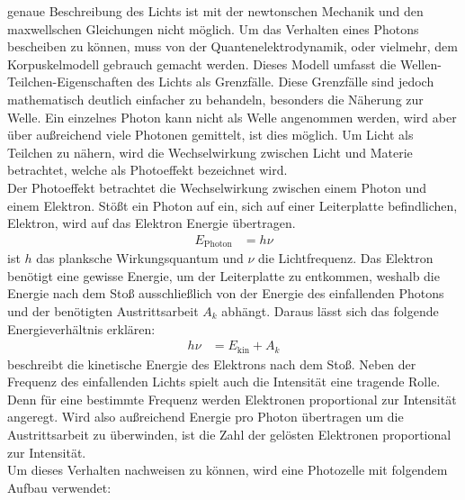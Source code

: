     \justifying genaue Beschreibung des Lichts ist mit der newtonschen Mechanik und den maxwellschen Gleichungen nicht möglich. Um das Verhalten eines Photons
    bescheiben zu können, muss von der Quantenelektrodynamik, oder vielmehr, dem Korpuskelmodell gebrauch gemacht werden. Dieses Modell umfasst die Wellen-Teilchen-Eigenschaften
    des Lichts als Grenzfälle. Diese Grenzfälle sind jedoch mathematisch deutlich einfacher zu behandeln, besonders die Näherung zur Welle. Ein einzelnes Photon kann nicht als
    Welle angenommen werden, wird aber über außreichend viele Photonen gemittelt, ist dies möglich. Um Licht als Teilchen zu nähern, wird die Wechselwirkung zwischen Licht und 
    Materie betrachtet, welche als Photoeffekt bezeichnet wird.\\
    Der Photoeffekt betrachtet die Wechselwirkung zwischen einem Photon und einem Elektron. Stößt ein Photon auf ein, sich auf einer Leiterplatte befindlichen, Elektron, wird
    auf das Elektron Energie übertragen. \cite{V500}
    \begin{align}
        E_{\text{Photon}} &= h\nu \label{eq:1}
    \end{align} 
    \justifying ist $h$ das planksche Wirkungsquantum und $\nu$ die Lichtfrequenz. Das Elektron benötigt eine gewisse Energie, um der Leiterplatte zu entkommen, weshalb die Energie
    nach dem Stoß ausschließlich von der Energie des einfallenden Photons und der benötigten Austrittsarbeit $A_k$ abhängt. Daraus lässt sich das folgende Energieverhältnis
    erklären: \cite{V500}
    \begin{align}
        h\nu &= E_{\text{kin}} + A_k \label{eq:2}
    \end{align}
    \justifying beschreibt die kinetische Energie des Elektrons nach dem Stoß. Neben der Frequenz des einfallenden Lichts spielt auch die Intensität eine tragende Rolle. 
    Denn für eine bestimmte Frequenz werden Elektronen proportional zur Intensität angeregt. Wird also außreichend Energie pro Photon übertragen um die Austrittsarbeit zu 
    überwinden, ist die Zahl der gelösten Elektronen proportional zur Intensität.\\
    Um dieses Verhalten nachweisen zu können, wird eine Photozelle mit folgendem Aufbau verwendet:
